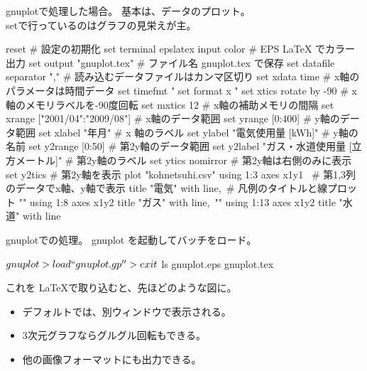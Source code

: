 \begin{frame}[containsverbatim]{gnuplotで処理した場合。}
基本は、データのプロット。\\
setで行っているのはグラフの見栄えが主。

 \begin{commandline0}
reset                                        # 設定の初期化
set terminal epslatex input color            # EPS LaTeX でカラー出力
set output "gnuplot.tex"                     # ファイル名 gnuplot.tex で保存
set datafile separator ","                   # 読み込むデータファイルはカンマ区切り
set xdata time                               # x軸のパラメータは時間データ
set timefmt "%
set format x "%
set xtics rotate by -90                      # x軸のメモリラベルを-90度回転
set mxtics 12                                # x軸の補助メモリの間隔
set xrange ["2001/04":"2009/08"]             # x軸のデータ範囲
set yrange [0:400]                           # y軸のデータ範囲
set xlabel "年月"                            # x 軸のラベル
set ylabel "電気使用量 [kWh]"                 # y軸の名前
set y2range [0:50]                           # 第2y軸のデータ範囲
set y2label "ガス・水道使用量 [立方メートル]"  # 第2y軸のラベル
set ytics nomirror                           # 第2y軸は右側のみに表示
set y2tics                                   # 第2y軸を表示
plot "kohnetsuhi.csv" using 1:3 axes x1y1 \  # 第1,3列のデータでx軸、y軸で表示
  title "電気" with line,\                    # 凡例のタイトルと線プロット
  "" using 1:8 axes x1y2 title "ガス" with line,\ 
  "" using 1:13 axes x1y2 title "水道" with line
 \end{commandline0}
\end{frame}

\begin{frame}[containsverbatim]{gnuplotでの処理。}
gnuplot を起動してバッチをロード。

\begin{commandline}
$ gnuplot
> load ``gnuplot.gp''
> exit
$ ls
gnuplot.eps gnuplot.tex
\end{commandline}

これを LaTeXで取り込むと、先ほどのような図に。
\begin{itemize}
 \item デフォルトでは、別ウィンドウで表示される。
 \item 3次元グラフならグルグル回転もできる。
 \item 他の画像フォーマットにも出力できる。
\end{itemize}
\end{frame}

